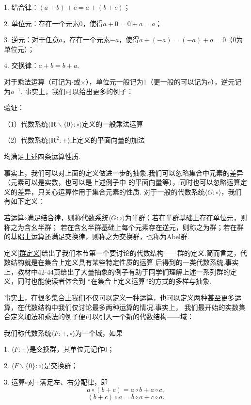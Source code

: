 	1. 结合律：$(a+b)+c=a+(b+c)$；
	
	2. 单位元：存在一个元素$0$，使得$a+0=0+a=a$；
	
	3. 逆元：对于任意$a$，存在一个元素$-a$，使得$a+(-a)=(-a)+a=0$（0为单位元）；
	
	4. 交换律：$a+b=b+a$.

对于乘法运算（可记为$\cdot$或$\times$），单位元一般记为1（更一般的可以记为$e$），逆元记为$a^{-1}$.
事实上，我们可以给出更多的例子：
\begin{example}\label{Abel群例}
	验证：

	（1）代数系统$\langle \mathbf{R}\backslash\{0\}:\circ\rangle$定义的一般乘法运算

	（2）代数系统$\langle \mathbf{R}^2:+\rangle$上定义的平面向量的加法

	均满足上述四条运算性质.
\end{example}

事实上，我们可以对上面的定义做进一步的抽象.我们可以忽略集合中元素的差异（元素可以是实数，也可以是上述例子中
的平面向量等），同时也可以忽略运算定义的差异，只关心运算作用于集合元素的性质.
对于一般的代数系统$\langle G:\circ\rangle$，我们有如下定义：
\begin{definition}\label{群定义}
	若运算$\circ$满足结合律，则称代数系统$\langle G:\circ\rangle$为半群；若在半群基础上存在单位元，则称之为含幺半群；
	若在含幺半群基础上每个元素存在逆元，则称之为群；若在群的基础上运算还满足交换律，则称之为交换群，也称为Abel群.
\end{definition}

定义\ref{群定义}给出了我们本节第一个要讨论的代数结构——群的定义.简而言之，代数结构就是在集合上定义具有某些特定性质的运算
后得到的一类代数系统.事实上，教材中42-44页给出了大量抽象的例子有助于同学们理解上述一系列群的定义，同时也能使读者体会到
“在集合上定义运算”的方式的多样与抽象.

事实上，在很多集合上我们不仅可以定义一种运算，也可以定义两种甚至更多运算，在代数结构中我们仅讨论最多两种运算的情况.事实上，
我们最开始的实数集合定义加法和乘法的例子便可以引入一个新的代数结构——域：
\begin{definition}
	我们称代数系统$\langle F:+,\circ\rangle$为一个域，如果

	1. $\langle F:+\rangle$是交换群，其单位元记作0；
	
	2. $\langle F\backslash\{0\}:\circ\rangle$是交换群；
	
	3. 运算$\circ$对$+$满足左、右分配律，即
	$$a\circ(b+c)=a\circ b+a\circ c,$$
	$$(b+c)\circ a=b\circ a+c\circ a.$$
\end{definition}

